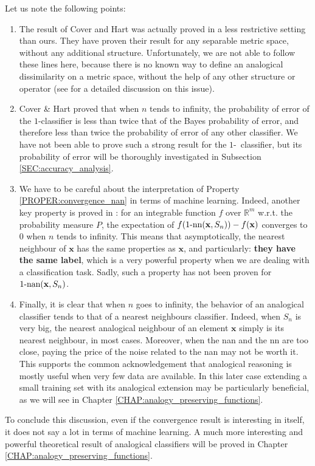 Let us note the following points:
\begin{enumerate}
\item The result of Cover and Hart was actually proved in a less restrictive
  setting than ours. They have proven their result for any separable metric
    space, without any additional structure. Unfortunately, we are not able to
    follow these lines here, because there is no known way to define an
    analogical dissimilarity on a metric space, without the help of any other
    structure or operator (see \cite{MicBayDelJAIR08} for a detailed discussion
    on this issue).
  \item Cover \& Hart proved that when $n$ tends to infinity, the probability
    of error of the $1$-\NN classifier is less than twice that of the Bayes
    probability of error, and therefore less than twice the probability of error of
    any other classifier. We have not been able to prove such a strong result
    for the $1$-\NAN~classifier, but its probability of error will be thoroughly
    investigated in Subsection \ref{SEC:accuracy_analysis}.
  \item We have to be careful about the interpretation of Property
    \ref{PROPER:convergence_nan} in terms of machine learning. Indeed, another
    key property is proved in \cite{CovHarTIT67}: for an integrable
    function $f$  over $\mathbb{R}^m$ w.r.t. the probability measure $P$, the
    expectation of $f(1\mbox{-nn}(\mathbf{x},S_n))- f(\mathbf{x})$ converges to 0 when
    $n$ tends to infinity.  This means that asymptotically, the nearest
    neighbour of $\mathbf{x}$ has the same properties as $\mathbf{x}$, and
    particularly: \textbf{they have the same label}, which is a very powerful
    property when we are dealing with a classification task. Sadly, such a
    property has not been proven for $1\text{-nan}(\mathbf{x}, S_n)$.
\item Finally, it is clear that when $n$ goes to infinity, the behavior of an
  analogical classifier tends to that of a nearest neighbours classifier.
    Indeed, when $S_n$ is very big, the nearest analogical neighbour of an
    element $\mathbf{x}$ simply is its nearest neighbour, in most cases.
    Moreover, when the nan and the nn are too close, paying the price of the
    noise related to the nan may not be worth it. This supports the common
    acknowledgement that analogical reasoning is mostly useful when very few
    data are available.  In this later case extending a small training set with
    its analogical extension may be particularly beneficial, as we will see in
    Chapter \ref{CHAP:analogy_preserving_functions}.

\end{enumerate}
To conclude this discussion, even if the convergence result is interesting in
itself, it does not say a lot in terms of machine learning. A much more
interesting and powerful theoretical result of analogical classifiers will be
proved in Chapter \ref{CHAP:analogy_preserving_functions}.

